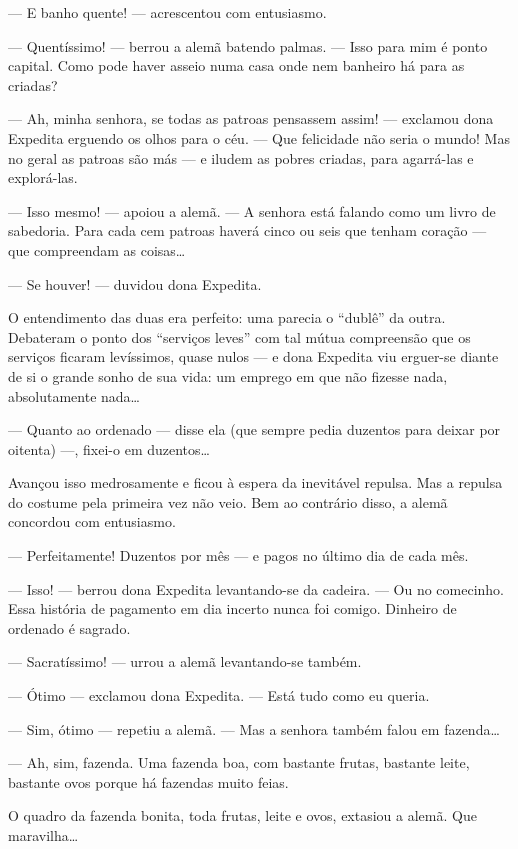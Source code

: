 --- E banho quente! --- acrescentou com entusiasmo.

--- Quentíssimo! --- berrou a alemã batendo palmas. --- Isso para mim é
ponto capital. Como pode haver asseio numa casa onde nem banheiro há
para as criadas?

--- Ah, minha senhora, se todas as patroas pensassem assim! --- exclamou
dona Expedita erguendo os olhos para o céu. --- Que felicidade não seria
o mundo! Mas no geral as patroas são más --- e iludem as pobres criadas,
para agarrá-las e explorá-las.

--- Isso mesmo! --- apoiou a alemã. --- A senhora está falando como um
livro de sabedoria. Para cada cem patroas haverá cinco ou seis que
tenham coração --- que compreendam as coisas\ldots{}

--- Se houver! --- duvidou dona Expedita.

O entendimento das duas era perfeito: uma parecia o ``dublê'' da outra.
Debateram o ponto dos ``serviços leves'' com tal mútua compreensão que
os serviços ficaram levíssimos, quase nulos --- e dona Expedita viu
erguer-se diante de si o grande sonho de sua vida: um emprego em que não
fizesse nada, absolutamente nada\ldots{}

--- Quanto ao ordenado --- disse ela (que sempre pedia duzentos para
deixar por oitenta) ---, fixei-o em duzentos\ldots{}

Avançou isso medrosamente e ficou à espera da inevitável repulsa. Mas a
repulsa do costume pela primeira vez não veio. Bem ao contrário disso, a
alemã concordou com entusiasmo.

--- Perfeitamente! Duzentos por mês --- e pagos no último dia de cada
mês.

--- Isso! --- berrou dona Expedita levantando-se da cadeira. --- Ou no
comecinho. Essa história de pagamento em dia incerto nunca foi comigo.
Dinheiro de ordenado é sagrado.

--- Sacratíssimo! --- urrou a alemã levantando-se também.

--- Ótimo --- exclamou dona Expedita. --- Está tudo como eu queria.

--- Sim, ótimo --- repetiu a alemã. --- Mas a senhora também falou em
fazenda\ldots{}

--- Ah, sim, fazenda. Uma fazenda boa, com bastante frutas, bastante
leite, bastante ovos porque há fazendas muito feias.

O quadro da fazenda bonita, toda frutas, leite e ovos, extasiou a alemã.
Que maravilha\ldots{}

